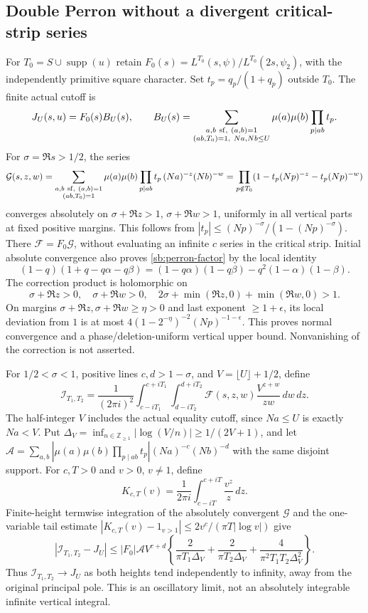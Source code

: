 \documentclass[11pt,oneside,openany]{book}
\theoremstyle{definition}\newtheorem{definition}[theorem]{Definition}
\theoremstyle{remark}\newtheorem{remark}[theorem]{Remark}
\begin{document}
\subsection{Double Perron without a divergent critical-strip series}
For $T_0=S\cup\operatorname{supp}(u)$ retain
$F_0(s)=L^{T_0}(s,\psi)/L^{T_0}(2s,\psi_2)$, with the independently
primitive square character. Set $t_p=q_p/(1+q_p)$ outside $T_0$.
The finite actual cutoff is
\[
 J_U(s,u)=F_0(s)B_U(s),\qquad
 B_U(s)=\sum_{\substack{a,b\ {\rm sf},\ (a,b)=1\\
                  (ab,T_0)=1,\ Na,Nb\le U}}
 \mu(a)\mu(b)\prod_{p\mid ab}t_p.
\]
For $\sigma=\Re s>1/2$, the series
\[
 \mathcal G(s,z,w)=\sum_{\substack{a,b\ {\rm sf},\ (a,b)=1\\(ab,T_0)=1}}
 \mu(a)\mu(b)\prod_{p\mid ab}t_p\,(Na)^{-z}(Nb)^{-w}
 =\prod_{p\notin T_0}(1-t_p(Np)^{-z}-t_p(Np)^{-w})
\]
converges absolutely on $\sigma+\Re z>1$, $\sigma+\Re w>1$, uniformly
in all vertical parts at fixed positive margins. This follows from
$|t_p|\le(Np)^{-\sigma}/(1-(Np)^{-\sigma})$. There
$\mathcal F=F_0\mathcal G$, without evaluating an infinite $c$ series
in the critical strip. Initial absolute convergence also proves
\eqref{sb:perron-factor} by the local identity
\[
 (1-q)(1+q-q\alpha-q\beta)
 =(1-q\alpha)(1-q\beta)-q^2(1-\alpha)(1-\beta).
\]
The correction product is holomorphic on
\[
 \sigma+\Re z>0,\quad\sigma+\Re w>0,\quad
 2\sigma+\min(\Re z,0)+\min(\Re w,0)>1.
\]
On margins $\sigma+\Re z,\sigma+\Re w\ge\eta>0$ and last exponent
$\ge1+\epsilon$, its local deviation from $1$ is at most
$4(1-2^{-\eta})^{-2}(Np)^{-1-\epsilon}$. This proves normal convergence
and a phase/deletion-uniform vertical upper bound. Nonvanishing of the
correction is not asserted.

For $1/2<\sigma<1$, positive lines $c,d>1-\sigma$, and
$V=\lfloor U\rfloor+1/2$, define
\[
 \mathcal I_{T_1,T_2}=\frac1{(2\pi i)^2}
 \int_{c-iT_1}^{c+iT_1}\int_{d-iT_2}^{d+iT_2}
 \mathcal F(s,z,w)\frac{V^{z+w}}{zw}\,dw\,dz.
\]
The half-integer $V$ includes the actual equality cutoff, since
$Na\le U$ is exactly $Na<V$. Put
$\Delta_V=\inf_{n\in\mathbb Z_{\ge1}}|\log(V/n)|\ge1/(2V+1)$, and let
$\mathcal A=\sum_{a,b}|\mu(a)\mu(b)\prod_{p\mid ab}t_p|
(Na)^{-c}(Nb)^{-d}$ with the same disjoint support.
For $c,T>0$ and $v>0$, $v\ne1$, define
\[
 K_{c,T}(v)=\frac1{2\pi i}\int_{c-iT}^{c+iT}\frac{v^z}{z}\,dz.
\]
Finite-height termwise integration of the absolutely convergent
$\mathcal G$ and the one-variable tail estimate
$|K_{c,T}(v)-1_{v>1}|\le2v^c/(\pi T|\log v|)$ give
\begin{equation}
 |\mathcal I_{T_1,T_2}-J_U|
 \le |F_0|\mathcal A V^{c+d}
 \left\{\frac2{\pi T_1\Delta_V}+\frac2{\pi T_2\Delta_V}
       +\frac4{\pi^2T_1T_2\Delta_V^2}\right\}.      \label{sb:perron-error}
\end{equation}
Thus $\mathcal I_{T_1,T_2}\to J_U$ as both heights tend independently to
infinity, away from the original principal pole. This is an oscillatory
limit, not an absolutely integrable infinite vertical integral.
\end{document}
